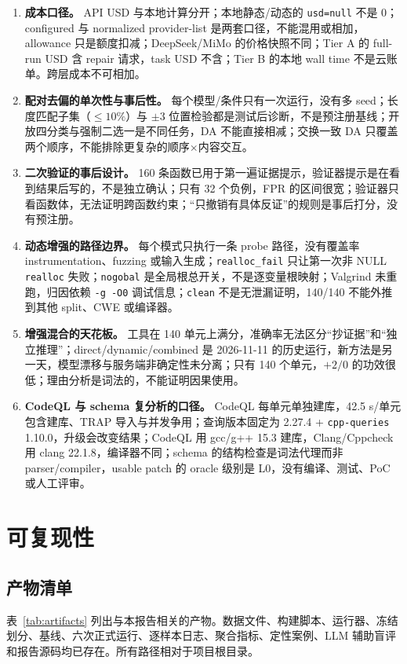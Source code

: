 \documentclass[conference]{IEEEtran}
\begin{document}
\begin{enumerate}
    \item \textbf{成本口径。} API USD 与本地计算分开；本地静态/动态的 \texttt{usd=null} 不是 0；configured 与 normalized provider-list 是两套口径，不能混用或相加，allowance 只是额度扣减；DeepSeek/MiMo 的价格快照不同；Tier A 的 full-run USD 含 repair 请求，task USD 不含；Tier B 的本地 wall time 不是云账单。跨层成本不可相加。
    \item \textbf{配对去偏的单次性与事后性。} 每个模型/条件只有一次运行，没有多 seed；长度匹配子集（$\le 10\%$）与 $\pm3$ 位置检验都是测试后诊断，不是预注册基线；开放四分类与强制二选一是不同任务，DA 不能直接相减；交换一致 DA 只覆盖两个顺序，不能排除更复杂的顺序$\times$内容交互。
    \item \textbf{二次验证的事后设计。} 160 条函数已用于第一遍证据提示，验证器提示是在看到结果后写的，不是独立确认；只有 32 个负例，FPR 的区间很宽；验证器只看函数体，无法证明跨函数约束；“只撤销有具体反证”的规则是事后打分，没有预注册。
    \item \textbf{动态增强的路径边界。} 每个模式只执行一条 probe 路径，没有覆盖率 instrumentation、fuzzing 或输入生成；\texttt{realloc\_fail} 只让第一次非 NULL \texttt{realloc} 失败；\texttt{nogobal} 是全局根总开关，不是逐变量根映射；Valgrind 未重跑，归因依赖 \texttt{-g -O0} 调试信息；\texttt{clean} 不是无泄漏证明，140/140 不能外推到其他 split、CWE 或编译器。
    \item \textbf{增强混合的天花板。} 工具在 140 单元上满分，准确率无法区分“抄证据”和“独立推理”；direct/dynamic/combined 是 2026-11-11 的历史运行，新方法是另一天，模型漂移与服务端非确定性未分离；只有 140 个单元，$+2/0$ 的功效很低；理由分析是词法的，不能证明因果使用。
    \item \textbf{CodeQL 与 schema 复分析的口径。} CodeQL 每单元单独建库，42.5 s/单元包含建库、TRAP 导入与并发争用；查询版本固定为 2.27.4 + \texttt{cpp-queries} 1.10.0，升级会改变结果；CodeQL 用 gcc/g++ 15.3 建库，Clang/Cppcheck 用 clang 22.1.8，编译器不同；schema 的结构检查是词法代理而非 parser/compiler，usable patch 的 oracle 级别是 L0，没有编译、测试、PoC 或人工评审。
\end{enumerate}

\section{可复现性}
\label{sec:reproducibility}
\subsection{产物清单}
表~\ref{tab:artifacts} 列出与本报告相关的产物。数据文件、构建脚本、运行器、冻结划分、基线、六次正式运行、逐样本日志、聚合指标、定性案例、LLM 辅助盲评和报告源码均已存在。所有路径相对于项目根目录。
\end{document}
